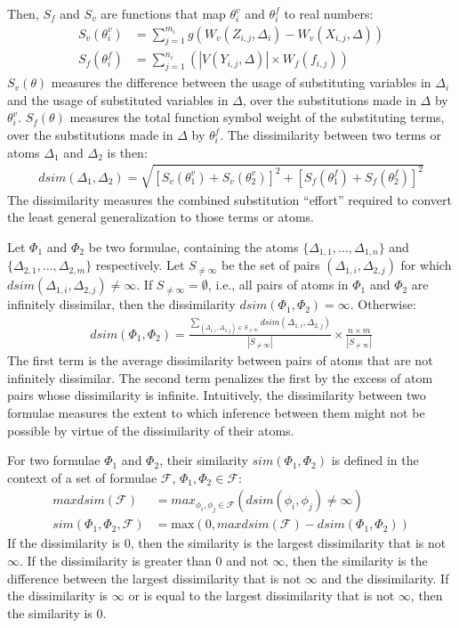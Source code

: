 \documentclass[]{ceurart}
\begin{document}
Then, $S_f$ and $S_v$ are functions that map $\theta_i^v$ and 
$\theta_i^f$ to real numbers:
\begin{align}
S_v(\theta_i^v) &= \sum_{j=1}^{m_i} g(W_v(Z_{i,j},\Delta_i) - W_v(X_{i,j},\Delta)) \\
S_f(\theta_i^f) &= \sum_{j=1}^{n_i} (|V(Y_{i,j},\Delta)| \times W_f(f_{i,j}))
\end{align}
$S_v(\theta)$ measures the difference between the usage of substituting 
variables in $\Delta_i$ and the usage of substituted variables 
in $\Delta$, over the substitutions made in $\Delta$ by $\theta_i^v$.
$S_f(\theta)$ measures the total function symbol weight of the substituting 
terms, over the substitutions made in $\Delta$ by $\theta_i^f$.
The dissimilarity between two terms or atoms $\Delta_1$ and $\Delta_2$ is then:
\begin{align}
dsim(\Delta_1,\Delta_2) = \sqrt{[S_v(\theta_1^v)+S_v(\theta_2^v)]^2+[S_f(\theta_1^f)+S_f(\theta_2^f)]^2}
\end{align}
The dissimilarity measures the combined substitution ``effort'' required to 
convert the least general generalization to those terms or atoms.

Let $\Phi_1$ and $\Phi_2$ be two formulae, containing the atoms
$\{\Delta_{1,1},\dots,\Delta_{1,n}\}$ and 
$\{\Delta_{2,1},\dots,\Delta_{2,m}\}$ respectively.
Let $S_{\neq\infty}$ be the set of pairs $(\Delta_{1,i},\Delta_{2,j})$ 
for which $dsim(\Delta_{1,i},\Delta_{2,j}) \neq \infty$.
If $S_{\neq\infty} = \emptyset$, i.e., all pairs of atoms in $\Phi_1$ and 
$\Phi_2$ are infinitely dissimilar, then the dissimilarity 
$dsim(\Phi_1,\Phi_2) = \infty$.
Otherwise:
\begin{align}
dsim(\Phi_1,\Phi_2) = 
\frac{\sum_{(\Delta_{1,i},\Delta_{2,j}) \in S_{\neq\infty}}dsim(\Delta_{1,i},\Delta_{2,j})}
{|S_{\neq\infty}|}
\times
\frac{n \times m}{|S_{\neq\infty}|} 
\end{align}
The first term is the average dissimilarity between pairs of atoms that are 
not infinitely dissimilar.
The second term penalizes the first by the excess of atom pairs whose
dissimilarity is infinite.
Intuitively, the dissimilarity between two formulae measures the extent 
to which inference between them might not be possible by virtue of the 
dissimilarity of their atoms.

For two formulae $\Phi_1$ and $\Phi_2$, their similarity $sim(\Phi_1,\Phi_2)$
is defined in the context of a set of formulae $\mathcal{F}$, 
$\Phi_1,\Phi_2 \in \mathcal{F}$:
\begin{align}
maxdsim(\mathcal{F}) &= max_{\phi_i,\phi_j \in \mathcal{F}} (dsim(\phi_i,\phi_j) \neq \infty) \\
sim(\Phi_1,\Phi_2,\mathcal{F}) &= \textrm{max}(0, maxdsim(\mathcal{F}) - dsim(\Phi_1,\Phi_2))
\end{align}
If the dissimilarity is $0$, then the similarity is the largest dissimilarity 
that is not $\infty$.
If the dissimilarity is greater than $0$ and not $\infty$, then the similarity 
is the difference between the largest dissimilarity that is not $\infty$ and 
the dissimilarity.
If the dissimilarity is $\infty$ or is equal to the largest 
dissimilarity that is not $\infty$, then the similarity is $0$.
\end{document}
